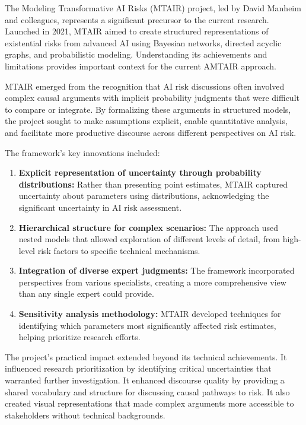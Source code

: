 \documentclass[
  11pt,
  letterpaper,
]{book}
\begin{document}
The Modeling Transformative AI Risks (MTAIR) project, led by David
Manheim and colleagues, represents a significant precursor to the
current research. Launched in 2021, MTAIR aimed to create structured
representations of existential risks from advanced AI using Bayesian
networks, directed acyclic graphs, and probabilistic modeling.
Understanding its achievements and limitations provides important
context for the current AMTAIR approach.

MTAIR emerged from the recognition that AI risk discussions often
involved complex causal arguments with implicit probability judgments
that were difficult to compare or integrate. By formalizing these
arguments in structured models, the project sought to make assumptions
explicit, enable quantitative analysis, and facilitate more productive
discourse across different perspectives on AI risk.

The framework's key innovations included:

\begin{enumerate}
\def\labelenumi{\arabic{enumi}.}
\item
  \textbf{Explicit representation of uncertainty through probability
  distributions:} Rather than presenting point estimates, MTAIR captured
  uncertainty about parameters using distributions, acknowledging the
  significant uncertainty in AI risk assessment.
\item
  \textbf{Hierarchical structure for complex scenarios:} The approach
  used nested models that allowed exploration of different levels of
  detail, from high-level risk factors to specific technical mechanisms.
\item
  \textbf{Integration of diverse expert judgments:} The framework
  incorporated perspectives from various specialists, creating a more
  comprehensive view than any single expert could provide.
\item
  \textbf{Sensitivity analysis methodology:} MTAIR developed techniques
  for identifying which parameters most significantly affected risk
  estimates, helping prioritize research efforts.
\end{enumerate}

The project's practical impact extended beyond its technical
achievements. It influenced research prioritization by identifying
critical uncertainties that warranted further investigation. It enhanced
discourse quality by providing a shared vocabulary and structure for
discussing causal pathways to risk. It also created visual
representations that made complex arguments more accessible to
stakeholders without technical backgrounds.
\end{document}
